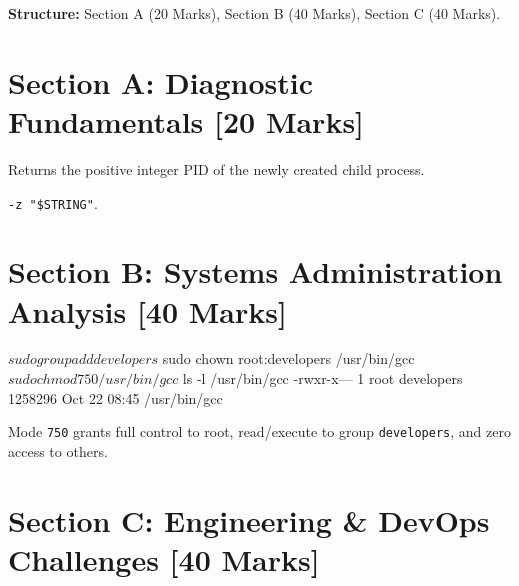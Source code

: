 
\begin{markingrubric}
\textbf{Structure:} Section A (20 Marks), Section B (40 Marks), Section C (40 Marks).
\end{markingrubric}

\section*{Section A: Diagnostic Fundamentals [20 Marks]}

\begin{examsol}
Returns the positive integer PID of the newly created child process.
\end{examsol}

\begin{examsol}
\texttt{-z "\$STRING"}.
\end{examsol}

\section*{Section B: Systems Administration Analysis [40 Marks]}


\begin{examsol}
\begin{examcli}
$ sudo groupadd developers
$ sudo chown root:developers /usr/bin/gcc
$ sudo chmod 750 /usr/bin/gcc
$ ls -l /usr/bin/gcc
-rwxr-x--- 1 root developers 1258296 Oct 22 08:45 /usr/bin/gcc
\end{examcli}
Mode \texttt{750} grants full control to root, read/execute to group \texttt{developers}, and zero access to others.
\end{examsol}

\section*{Section C: Engineering \& DevOps Challenges [40 Marks]}

